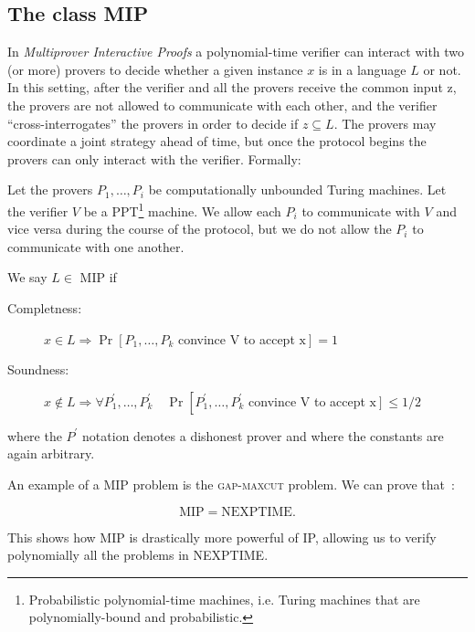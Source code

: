 \subsection{The class MIP}
In \emph{Multiprover Interactive Proofs} a polynomial-time verifier can interact with two (or more) provers to decide
whether a given instance $x$ is in a language $L$ or not. In this setting, after the verifier and all the provers receive the common input z, the provers are not allowed to communicate with each other, and the verifier “cross-interrogates” the provers in order to decide if $z \subseteq L$. The provers may coordinate a joint strategy ahead of time, but once the protocol begins the provers can only interact with the verifier. Formally:
\begin{defn}
    Let the provers $P_{1}, \ldots, P_{i}$ be computationally unbounded Turing machines. Let the verifier $V$ be a PPT\footnote{Probabilistic polynomial-time machines, i.e. Turing machines that are polynomially-bound and probabilistic.} machine. We allow each $P_{i}$ to communicate with $V$ and vice versa during the course of the protocol, but we do not allow the $P_{i}$ to communicate with one another. 
    
    We say $L \in$ MIP if 
    \begin{description}
\item[Completness: ]$x \in L \Rightarrow \operatorname{Pr}\left[P_{1}, \ldots, P_{k}\right.$ convince $\mathrm{V}$ to accept $\left.\mathrm{x}\right]=1$
\item[Soundness: ]$x \notin L \Rightarrow \forall P_{1}^{\prime}, \ldots, P_{k}^{\prime} \quad \operatorname{Pr}\left[P_{1}^{\prime}, \ldots, P_{k}^{\prime}\right.$ convince $\mathrm{V}$ to accept $\left.\mathrm{x}\right] \leq 1 / 2$
    \end{description}   
    where the $P^{\prime}$ notation denotes a dishonest prover and where the constants are again arbitrary.
\end{defn}

An example of a MIP problem is the \textsc{gap-maxcut} problem.
We can prove that~\cite{topicsin}:
\begin{theorem}\label{th:mip-nexptime}
    \begin{equation}
\text{MIP}=\text{NEXPTIME}.
    \end{equation}
\end{theorem}

This shows how MIP is drastically more powerful of IP, allowing us to verify polynomially all the problems in NEXPTIME.


